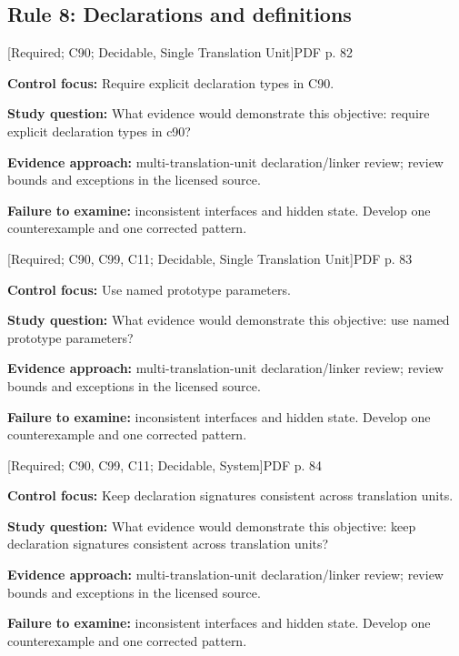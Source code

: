 \documentclass[10pt,letterpaper]{article}
\begin{document}
\subsection{Rule 8: Declarations and definitions}
 \textsf{\footnotesize [Required; C90; Decidable, Single Translation Unit]}\hfill{\footnotesize PDF p. 82}\par
\textbf{Control focus:} Require explicit declaration types in C90.\par
\textbf{Study question:} What evidence would demonstrate this objective: require explicit declaration types in c90?\par
\textbf{Evidence approach:} multi-translation-unit declaration/linker review; review bounds and exceptions in the licensed source.\par
\textbf{Failure to examine:} inconsistent interfaces and hidden state. Develop one counterexample and one corrected pattern.\par
\smallskip
{}
 \textsf{\footnotesize [Required; C90, C99, C11; Decidable, Single Translation Unit]}\hfill{\footnotesize PDF p. 83}\par
\textbf{Control focus:} Use named prototype parameters.\par
\textbf{Study question:} What evidence would demonstrate this objective: use named prototype parameters?\par
\textbf{Evidence approach:} multi-translation-unit declaration/linker review; review bounds and exceptions in the licensed source.\par
\textbf{Failure to examine:} inconsistent interfaces and hidden state. Develop one counterexample and one corrected pattern.\par
\smallskip
{}
 \textsf{\footnotesize [Required; C90, C99, C11; Decidable, System]}\hfill{\footnotesize PDF p. 84}\par
\textbf{Control focus:} Keep declaration signatures consistent across translation units.\par
\textbf{Study question:} What evidence would demonstrate this objective: keep declaration signatures consistent across translation units?\par
\textbf{Evidence approach:} multi-translation-unit declaration/linker review; review bounds and exceptions in the licensed source.\par
\textbf{Failure to examine:} inconsistent interfaces and hidden state. Develop one counterexample and one corrected pattern.\par
\end{document}
